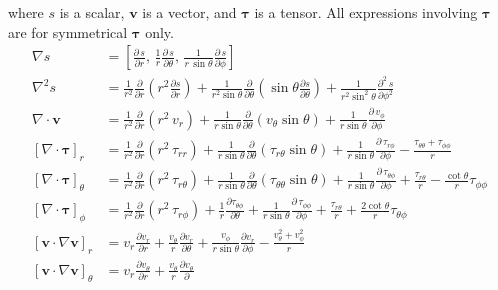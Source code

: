 \begin{datasheet}
where $s$ is a scalar, $\bm{v}$ is a vector, and $\bm{\tau}$ is a
tensor. All expressions involving $\bm{\tau}$ are for symmetrical
$\bm{\tau}$ only.
\begin{align*}
  \nabla s &= \left[\frac{\partial\,s}{\partial r},\,
    \frac{1}{r}\frac{\partial\,s}{\partial \theta},\,
    \frac{1}{r\,\sin\theta}\frac{\partial\,s}{\partial \phi}\right]
  \\
  \nabla^2 s &=\frac{1}{r^2}\frac{\partial}{\partial r}\left(r^2
    \frac{\partial s}{\partial r}\right) +
  \frac{1}{r^2\sin\theta}\frac{\partial}{\partial
    \theta}\left(\sin\theta \frac{\partial s}{\partial \theta}\right)+
  \frac{1}{r^2 \sin^2\theta}\frac{\partial^2\,s}{\partial \phi^2}
  \\
  \nabla\cdot\bm{v} &= \frac{1}{r^2}\frac{\partial}{\partial
    r}\left(r^2\, v_r\right) +
  \frac{1}{r\sin\theta}\frac{\partial}{\partial
    \theta}\left(v_\theta\sin\theta\right)+
  \frac{1}{r\sin\theta}\frac{\partial\,v_\phi}{\partial \phi}
  \\
  \left[\nabla \cdot \bm{\tau}\right]_r &=
  \frac{1}{r^2}\frac{\partial}{\partial r}\left(r^2\,\tau_{rr}\right)
  + \frac{1}{r\sin\theta}\frac{\partial}{\partial
    \theta}\left(\tau_{r\theta}\sin\theta\right)
  +\frac{1}{r\sin\theta}\frac{\partial\, \tau_{r\phi}}{\partial \phi}
  - \frac{\tau_{\theta\theta}+\tau_{\phi\phi}}{r}
  \\
  \left[\nabla \cdot \bm{\tau}\right]_\theta &=
  \frac{1}{r^2}\frac{\partial}{\partial
    r}\left(r^2\,\tau_{r\theta}\right) +
  \frac{1}{r\sin\theta}\frac{\partial}{\partial
    \theta}\left(\tau_{\theta\theta}\sin\theta\right)
  +\frac{1}{r\sin\theta}\frac{\partial\, \tau_{\theta\phi}}{\partial
    \phi} + \frac{\tau_{r\theta}}{r} -
  \frac{\cot\theta}{r}\tau_{\phi\phi}
  \\
  \left[\nabla \cdot \bm{\tau}\right]_\phi &=
  \frac{1}{r^2}\frac{\partial}{\partial
    r}\left(r^2\,\tau_{r\phi}\right) + \frac{1}{r}\frac{\partial
    \tau_{\theta\phi}}{\partial \theta}
  +\frac{1}{r\sin\theta}\frac{\partial\, \tau_{\phi\phi}}{\partial
    \phi} + \frac{\tau_{r\theta}}{r} +
  \frac{2\cot\theta}{r}\tau_{\theta\phi}
  \\
  \left[\bm{v}\cdot \nabla \bm{v}\right]_r &= v_r \frac{\partial
    v_r}{\partial r} + \frac{v_\theta}{r}\frac{\partial v_r}{\partial
    \theta} + \frac{v_\phi}{r\sin\theta}\frac{\partial v_r}{\partial
    \phi}-\frac{v_\theta^2+v_\phi^2}{r}
  \\
  \left[\bm{v}\cdot \nabla \bm{v}\right]_\theta &= v_r \frac{\partial
    v_\theta}{\partial r} + \frac{v_\theta}{r}\frac{\partial v_\theta}{\partial
}
\end{align*}
\end{datasheet}
